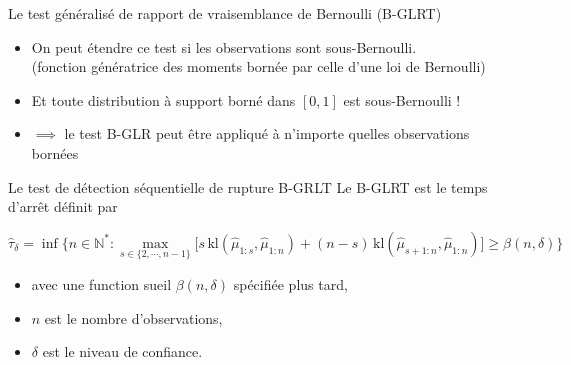 \documentclass[11pt,french,ignorenonframetext,]{beamer}
\providecommand{\tightlist}{%
  \setlength{\itemsep}{0pt}\setlength{\parskip}{0pt}}
\begin{document}
\begin{frame}{Le test généralisé de rapport de vraisemblance de Bernoulli (B-GLRT)}

  \begin{itemize}
    \item
    On peut étendre ce test si les observations sont \alert{sous-Bernoulli}.\\
    (fonction génératrice des moments bornée par celle d'une loi de Bernoulli)
    \item
    Et toute distribution à support borné dans $[0,1]$ est sous-Bernoulli !
    \item
    $\implies$ le test B-GLR peut être appliqué à n'importe quelles observations bornées \dCooley{}
  \end{itemize}


  \pause

  \begin{block}{Le test de détection séquentielle de rupture B-GRLT}
    Le \alert{B-GLRT} est le temps d'arrêt définit par
    \begin{small}
    \[ \widehat{\tau}_{\delta} = \inf \bigl\{ n \in \mathbb{N}^* : \max_{s \in \{2,\cdots,n-1\}} \bigl[s \, \mathrm{kl}\left(\widehat{\mu}_{1:s},\widehat{\mu}_{1:n}\right) + (n-s) \, \mathrm{kl}\left(\widehat{\mu}_{s+1:n},\widehat{\mu}_{1:n}\right)\bigr] \geq \beta(n,\delta) \bigr\} \]
    \vspace*{-10pt}
    \end{small}%
    \begin{itemize}\tightlist
      \item avec une \alert{function sueil} $\beta(n,\delta)$ spécifiée plus tard,
      \item $n$ est le nombre d'observations,
      \item $\delta$ est le niveau de confiance.
    \end{itemize}%
  \end{block}

\end{frame}
\end{document}
